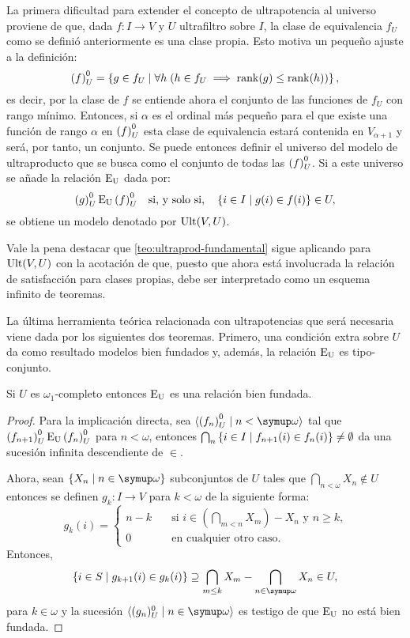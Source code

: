 \documentclass
[
  12pt,
  letterpaper,
  openany,
  oneside,
]{book}
\begin{document}
La primera dificultad para extender el concepto de ultrapotencia al universo
proviene de que, dada $f\colon I\to V$ y $U$ ultrafiltro sobre $I$,
la clase de equivalencia $f_U$ como se definió anteriormente es una clase propia.
Esto motiva un pequeño ajuste a la definición:
\[
    {(f)}_U^0 = \left\{ g \in f_U\mid \forall h\; (h\in f_U\implies \operatorname{rank}(g)\leq\operatorname{rank}(h)) \right\},
\]
es decir, por la clase de $f$ se entiende ahora el conjunto de las funciones
de $f_U$ con rango mínimo. Entonces, si $\alpha$ es el ordinal más pequeño para
el que existe una función de rango $\alpha$ en ${(f)}_U^0$ esta clase de equivalencia estará
contenida en $V_{\alpha+1}$ y será, por tanto, un conjunto. Se puede entonces definir
el universo del modelo de ultraproducto que se busca como el conjunto de todas las ${(f)}_U^0$.
Si a este universo se añade la relación $\operatorname{E_U}$ dada por:
\[
    {(g)}_U^0 \operatorname{E_U} {(f)}_U^0
    \quad\text{si, y solo si,}\quad
    \left\{ i\in I\mid g(i)\in f(i) \right\}\in U,
\]
se obtiene un modelo
denotado por $\operatorname{Ult}(V,U)$.

Vale la pena destacar que \ref{teo:ultraprod-fundamental} sigue aplicando para
$\operatorname{Ult}(V,U)$ con la acotación de que, puesto que ahora está involucrada la relación
de satisfacción para clases propias, debe ser interpretado como un esquema infinito de teoremas.

La última herramienta teórica relacionada con ultrapotencias que será necesaria viene
dada por los siguientes dos teoremas. Primero, una condición extra sobre $U$ da como resultado
modelos bien fundados y, además, la relación $\operatorname{E_U}$ es tipo-conjunto.

\begin{teo}\label{teo:Eu-well-founded}
    Si $U$ es $\omega_1$-completo entonces $\operatorname{E_U}$ es una relación bien fundada.
\end{teo}
\begin{proof}
    Para la implicación directa, sea $\seq{\ecl{f_n}\mid n<\omega}$ tal que
    ${(f_{n+1})}_U^0\operatorname{E_U}{(f_n)}_U^0$ para $n<\omega$,
    entonces $\bigcap_n\left\{ i\in I\mid f_{n+1}(i)\in f_n(i) \right\}\neq\emptyset$
    da una sucesión infinita descendiente de $\in$.

    Ahora, sean $\set{X_n\mid n\in\omega}$ subconjuntos de $U$ tales que
    $\bigcap_{n<\omega} X_n\notin U$ entonces se definen $g_k\colon I\to V$
    para $k<\omega$ de la siguiente forma:
    \[
        g_k(i) =
        \begin{cases}
          n-k\quad & \text{si $i\in(\bigcap_{m<n} X_m) - X_n$ y $n\geq k$,}\\
          0\quad & \text{en cualquier otro caso.}
        \end{cases}
    \]
    Entonces,
    \[
        \set{i\in S\mid g_{k+1}(i)\in g_k(i)}
        \supseteq
        \bigcap_{m\leq k} X_m - \bigcap_{n\in\omega} X_n
        \in U,
    \]
    para $k\in\omega$ y la sucesión $\seq{(g_n)_U^0\mid n\in\omega}$ es testigo de que $\operatorname{E_U}$
    no está bien fundada.
\end{proof}
\end{document}
